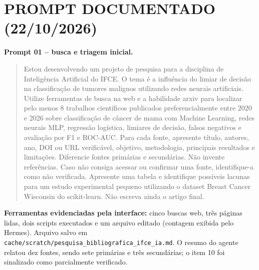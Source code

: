 \documentclass[article,12pt,oneside,a4paper,english,brazil,sumario=tradicional]{abntex2}
\begin{document}
\section{PROMPT DOCUMENTADO (22/10/2026)}
\noindent\textbf{Prompt 01 -- busca e triagem inicial.}\\
\begin{quote}\small Estou desenvolvendo um projeto de pesquisa para a disciplina de Inteligência Artificial do IFCE. O tema é a influência do limiar de decisão na classificação de tumores malignos utilizando redes neurais artificiais. Utilize ferramentas de busca na web e a habilidade arxiv para localizar pelo menos 8 trabalhos científicos publicados preferencialmente entre 2020 e 2026 sobre classificação de câncer de mama com Machine Learning, redes neurais MLP, regressão logística, limiares de decisão, falsos negativos e avaliação por F1 e ROC-AUC. Para cada fonte, apresente título, autores, ano, DOI ou URL verificável, objetivo, metodologia, principais resultados e limitações. Diferencie fontes primárias e secundárias. Não invente referências. Caso não consiga acessar ou confirmar uma fonte, identifique-a como não verificada. Apresente uma tabela e identifique possíveis lacunas para um estudo experimental pequeno utilizando o dataset Breast Cancer Wisconsin do scikit-learn. Não escreva ainda o artigo final.\end{quote}
\noindent\textbf{Ferramentas evidenciadas pela interface:} cinco buscas web, três páginas lidas, dois scripts executados e um arquivo editado (contagem exibida pelo Hermes). Arquivo salvo em \texttt{cache/scratch/pesquisa\_bibliografica\_ifce\_ia.md}. O resumo do agente relatou dez fontes, sendo sete primárias e três secundárias; o item 10 foi sinalizado como parcialmente verificado.
\end{document}
